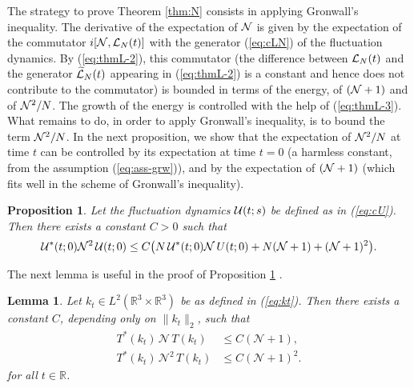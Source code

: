 \documentclass[11pt,a4paper,DIV11]{scrartcl}	%
\newtheorem{proposition}[thm]{Proposition}
\newtheorem{lemma}[thm]{Lemma}
\newtheorem*{rem}{Remark}
\newcommand{\cU}{{\cal U}}
\newcommand{\bR}{{\mathbb R}}
\newcommand{\wt}{\widetilde}
\newcommand{\cL}{{\cal L}}
\newcommand{\cN}{{\cal N}}
\newcommand{\R}{\mathds{R}}
\newcommand{\N}{\mathcal{N}}
\newcommand{\K}{\mathcal{K}}
\begin{document}
The strategy to prove Theorem \ref{thm:N} consists in applying Gronwall's inequality. The derivative of the expectation of $\cN$ is given by the expectation of the commutator $i[\cN , \cL_N (t)]$ with the generator (\ref{eq:cLN}) of the fluctuation dynamics. By (\ref{eq:thmL-2}), this commutator (the difference between $\cL_N (t)$ and the generator $\wt{\cL}_N (t)$ appearing in (\ref{eq:thmL-2}) is a constant and hence does not contribute to the commutator) is bounded in terms of the energy, of $(\cN+ 1)$ and of $\cN^2/N$. The growth of the energy is controlled with the help of (\ref{eq:thmL-3}). What remains to do, in order to apply Gronwall's inequality, is to bound the term $\cN^2 / N$. In the next proposition, we show that the expectation of $\cN^2/N$ at time $t$ can be controlled by its expectation at time $t=0$ (a harmless constant, from the assumption (\ref{eq:ass-grw})), and by the expectation of $(\cN+1)$ (which fits well in the scheme of Gronwall's inequality). 

\begin{proposition} \label{prop:apri}
Let the fluctuation dynamics $\cU (t;s)$ be defined as in (\ref{eq:cU}). Then there exists a constant $C > 0$ such that
 \[ \cU^* (t;0) \N^2 \, \cU (t;0) \le C \big( N  \, \cU^* (t;0) \N \, U (t;0) + N (\N+1) + (\N+1)^2 \big).
 \]
\end{proposition}

The next lemma is useful in the proof of Proposition \ref{prop:apri} .
\begin{lemma} \label{lm:TNT}
Let $k_t \in L^2(\R^3 \times \R^3)$ be as defined in (\ref{eq:kt}). Then there exists a constant $C$, depending only on $\| k_t \|_2$, such that 
\begin{align}
    T^* (k_t)  \, \N \, T (k_t) & \le C (\N+1), \label{eq:TNT} \\
    T^* (k_t) \, \N^2 \, T (k_t) & \le C (\N+1)^2. \label{eq:TN2T} %
  \end{align}
for all $t \in \bR$.
\end{lemma}

\end{document}
